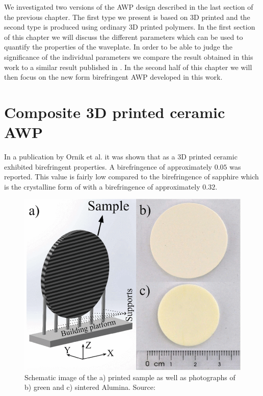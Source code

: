 We investigated two versions of the AWP design described in the last section of the previous chapter. The first type we present is based on 3D printed  and the second type is produced using ordinary 3D printed polymers. In the first section of this chapter we will discuss the different parameters which can be used to quantify the properties of the waveplate. In order to be able to judge the significance of the individual parameters we compare the result obtained in this work to a similar result published in \cite{Masson2006}. In the second half of this chapter we will then focus on the new form birefringent AWP developed in this work.

\section{Composite 3D printed ceramic AWP}
In a publication by Ornik et al. it was shown that  as a 3D printed ceramic exhibited birefringent properties. A birefringence of approximately $0.05$ was reported. This value is fairly low compared to the birefringence of sapphire which is the crystalline form of  with a birefringence of approximately $0.32$. 

\begin{figure}[ht]
    \centering
    \includegraphics[scale=0.4]{images/results/ornikabclarge.png}
    \caption{Schematic image of the a) printed sample as well as photographs of b) green and c) sintered Alumina. Source: \cite{Ornik2021}}
    \label{fig:ornik1abc}
\end{figure}

